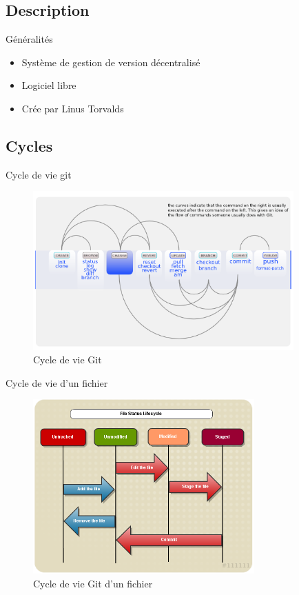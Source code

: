 \begin{frame}
	\sectionpage
\end{frame}

\subsection{Description}
	\begin{frame}{Généralités}
		\begin{itemize}[<+->]
			\item Système de gestion de version décentralisé
			\item Logiciel libre
			\item Crée par Linus Torvalds
		\end{itemize}

	\end{frame}

\subsection{Cycles}
	
	\begin{frame}{Cycle de vie git}
		\begin{figure}
			\centering
			\includegraphics[width=100mm]{./Img/GitCycle.png}
			\caption{Cycle de vie Git}
		\end{figure}

		
	\end{frame}
	
	\begin{frame}{Cycle de vie d'un fichier}
		\begin{figure}
			\centering
			\includegraphics[width=85mm]{./Img/GitLife.png}
			\caption{Cycle de vie Git d'un fichier}
		\end{figure}

	 
	\end{frame}
